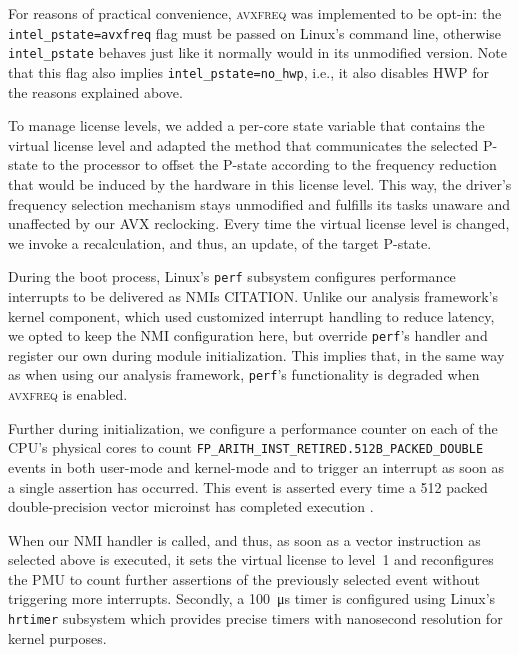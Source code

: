 For reasons of practical convenience, \textsc{avxfreq} was implemented to be opt-in: the \texttt{intel\_pstate=avxfreq} flag must be passed on Linux's command line, otherwise \texttt{intel\_pstate} behaves just like it normally would in its unmodified version. Note that this flag also implies \texttt{intel\_pstate=no\_hwp}, i.e., it also disables \gls{HWP} for the reasons explained above.

To manage license levels, we added a per-core state variable that contains the virtual license level and adapted the method that communicates the selected \gls{P-state} to the processor to offset the \gls{P-state} according to the frequency reduction that would be induced by the hardware in this license level. This way, the driver's frequency selection mechanism stays unmodified and fulfills its tasks unaware and unaffected by our \gls{AVX} reclocking. Every time the virtual license level is changed, we invoke a recalculation, and thus, an update, of the target \gls{P-state}.

During the boot process, Linux's \texttt{perf} subsystem configures performance interrupts to be delivered as \glspl{NMI} CITATION. Unlike our analysis framework's kernel component, which used customized interrupt handling to reduce latency, we opted to keep the \gls{NMI} configuration here, but override \texttt{perf}'s handler and register our own during module initialization. This implies that, in the same way as when using our analysis framework, \texttt{perf}'s functionality is degraded when \textsc{avxfreq} is enabled.

Further during initialization, we configure a performance counter on each of the \gls{CPU}'s physical cores to count  \texttt{FP\_ARITH\_INST\_RETIRED.512B\_PACKED\_DOUBLE} events in both user-mode and kernel-mode and to trigger an interrupt as soon as a single assertion has occurred. This event is asserted every time a \SI{512}{\bit} packed double-precision vector \gls{microinst} has completed execution \cite{intelsdmsysprogguide}.

When our \gls{NMI} handler is called, and thus, as soon as a vector instruction as selected above is executed, it sets the virtual license to level~1 and reconfigures the \gls{PMU} to count further assertions of the previously selected event without triggering more interrupts. Secondly, a \SI{100}{\micro\second} timer is configured using Linux's \texttt{hrtimer} subsystem which provides precise timers with nanosecond resolution for kernel purposes.

